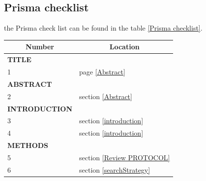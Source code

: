 \documentclass{svproc}
\begin{document}
\subsection{Prisma checklist}
the Prisma check list can be found in the table \ref{Prisma checklist}.
\begin{table}[]
\begin{tabular}{|ll|l|}
\hline
\multicolumn{2}{|c|}{{\color[HTML]{000000} \textbf{Number}}} & \multicolumn{1}{c|}{{\color[HTML]{000000} \textbf{Location}}} \\ \hline
\multicolumn{2}{|l|}{\textbf{TITLE}}                         &                                                               \\ \hline
\multicolumn{2}{|l|}{1}                                      & page \ref{Abstract}                                                             \\ \hline
\multicolumn{2}{|l|}{\textbf{ABSTRACT}}                      &                                                               \\ \hline
\multicolumn{2}{|l|}{2}                                      & section \ref{Abstract}                                                             \\ \hline
\multicolumn{2}{|l|}{\textbf{INTRODUCTION}}                  &                                                               \\ \hline
\multicolumn{2}{|l|}{3}                                      & section \ref{introduction}                                                              \\ \hline
\multicolumn{2}{|l|}{4}                                      & section \ref{introduction}                                                               \\ \hline
\multicolumn{2}{|l|}{\textbf{METHODS}}                       &                                                               \\ \hline
\multicolumn{2}{|l|}{5}                                      & section \ref{Review PROTOCOL}                                                       \\ \hline
\multicolumn{2}{|l|}{6}                                      & section \ref{searchStrategy}                                           \\ \hline

\end{tabular}
\end{table}
\end{document}
